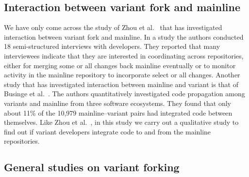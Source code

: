 \subsection{Interaction between variant fork and mainline}
We have only come across the study of Zhou et al.~\cite{Zhou:2020} that has investigated interaction between variant fork and mainline.
 
In a study the authors conducted 18 semi-structured interviews with developers. They reported that many interviewees indicate that they are interested in coordinating across repositories, either for merging some or all changes back mainline eventually or to monitor activity in the mainline repository to incorporate select or all changes. Another study that has investigated interaction between mainline and variant is that of Businge et al.~\cite{businge:emse:2021}. The authors quantitatively investigated code propagation among variants and mainline from three software ecosystems. They found that only about 11\% of the 10,979 mainline--variant pairs had integrated code between themselves. Like Zhou et al.~\cite{Zhou:2020}, in this study we carry out a qualitative study to find out if variant developers integrate code to and from the mainline repositories.

\subsection{General studies on variant forking}
